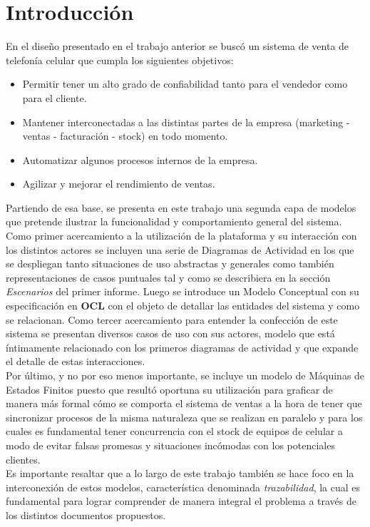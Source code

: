 \section{Introducción}
En el diseño presentado en el trabajo anterior se buscó un sistema de venta de telefonía celular que cumpla los siguientes objetivos:
\begin{itemize}
	\item Permitir tener un alto grado de confiabilidad tanto para el vendedor como para el cliente.
	\item Mantener interconectadas a las distintas partes de la empresa (marketing - ventas - facturación - stock) en todo momento.
	\item Automatizar algunos procesos internos de la empresa.
	\item Agilizar y mejorar el rendimiento de ventas.
\end{itemize}

Partiendo de esa base, se presenta en este trabajo una segunda capa de modelos que pretende ilustrar la funcionalidad y comportamiento general del sistema.\\
\indent Como primer acercamiento a la utilización de la plataforma y su interacción con los distintos actores se incluyen una serie de Diagramas de Actividad en los que se despliegan tanto situaciones de uso abstractas y generales como también representaciones de casos puntuales tal y como se describiera en la sección \textsl{Escenarios} del primer informe. Luego se introduce un Modelo Conceptual con su especificación en \textbf{OCL} con el objeto de detallar las entidades del sistema y como se relacionan. Como tercer acercamiento para entender la confección de este sistema se presentan diversos casos de uso con sus actores, modelo que está íntimamente relacionado con los primeros diagramas de actividad y que expande el detalle de estas interacciones.\\
\indent Por último, y no por eso menos importante, se incluye un modelo de Máquinas de Estados Finitos puesto que resultó oportuna su utilización para graficar de manera más formal cómo se comporta el sistema de ventas a la hora de tener que sincronizar procesos de la misma naturaleza que se realizan en paralelo y para los cuales es fundamental tener concurrencia con el stock de equipos de celular a modo de evitar falsas promesas y situaciones incómodas con los potenciales clientes.\\
\indent Es importante resaltar que a lo largo de este trabajo también se hace foco en la interconexión de estos modelos, característica denominada \textsl{trazabilidad}, la cual es fundamental para lograr comprender de manera integral el problema a través de los distintos documentos propuestos.\\

